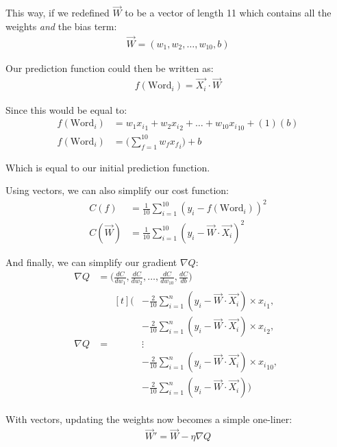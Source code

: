 \documentclass[12pt]{article}
\begin{document}
This way, if we redefined $\vec{W}$ to be a vector of length 11 which contains all the weights \textit{and} the bias term:
\begin{align*}
	\vec{W} = (w_1, w_2, \dots, w_{10}, b)
\end{align*}

Our prediction function could then be written as:
\begin{align*}
	f(\text{Word}_i) = \vec{X_i} \cdot \vec{W}
\end{align*}

Since this would be equal to:
\begin{align*}
	f(\text{Word}_i) & = w_1{x_i}_1 + w_2{x_i}_2 + \dots + w_{10}{x_i}_{10} + (1)(b)
	\\
	f(\text{Word}_i) & = \Big(\sum_{f=1}^{10} w_f{x_f}_i\Big) + b
\end{align*}

Which is equal to our initial prediction function.

\bigskip

Using vectors, we can also simplify our cost function:
\begin{align*}
	C(f)       & = \frac{1}{10} \sum_{i=1}^{10} (y_i - f(\text{Word}_i))^2
	\\
	C(\vec{W}) & = \frac{1}{10} \sum_{i=1}^{10} (y_i - \vec{W} \cdot \vec{X_i})^2
\end{align*}

And finally, we can simplify our gradient $\nabla Q$:
\begin{align*}
	\nabla Q & = \Big(\frac{dC}{dw_1}, \frac{dC}{dw_2}, \dots, \frac{dC}{dw_{10}}, \frac{dC}{db}\Big)
	\\
	\nabla Q & =
	\begin{aligned}[t]
		\Big(
		 & -\frac{2}{10} \sum_{i=1}^{n} (y_i - \vec{W} \cdot \vec{X_i}) \times {x_i}_1,
		\\
		 & -\frac{2}{10} \sum_{i=1}^{n} (y_i - \vec{W} \cdot \vec{X_i}) \times {x_i}_2,
		\\
		 & \vdots
		\\
		 & -\frac{2}{10} \sum_{i=1}^{n} (y_i - \vec{W} \cdot \vec{X_i}) \times {x_i}_{10},
		\\
		 & -\frac{2}{10} \sum_{i=1}^{n} (y_i - \vec{W} \cdot \vec{X_i})
		\Big)
	\end{aligned}
\end{align*}

With vectors, updating the weights now becomes a simple one-liner:
\begin{align*}
	\vec{W}' = \vec{W} - \eta\nabla Q
\end{align*}
\end{document}
